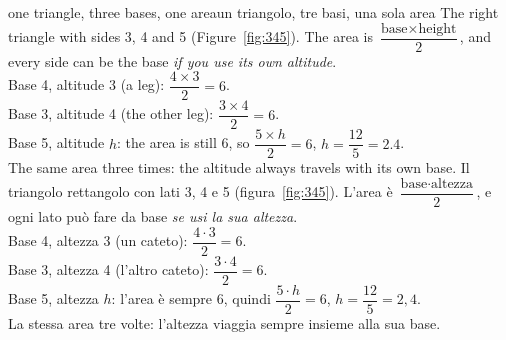 \begin{example}{one triangle, three bases, one area}{un triangolo, tre basi, una sola area}
The right triangle with sides 3, 4 and 5 (Figure~\ref{fig:345}). The area is $\dfrac{\text{base} \times \text{height}}{2}$, and every side can be the base \emph{if you use its own altitude}.\\
Base 4, altitude 3 (a leg): $\dfrac{4 \times 3}{2} = 6$.\\
Base 3, altitude 4 (the other leg): $\dfrac{3 \times 4}{2} = 6$.\\
Base 5, altitude $h$: the area is still 6, so $\dfrac{5 \times h}{2} = 6$, $h = \dfrac{12}{5} = 2.4$.\\
The same area three times: the altitude always travels with its own base.
\tcblower
Il triangolo rettangolo con lati 3, 4 e 5 (figura~\ref{fig:345}). L'area è $\dfrac{\text{base} \cdot \text{altezza}}{2}$, e ogni lato può fare da base \emph{se usi la sua altezza}.\\
Base 4, altezza 3 (un cateto): $\dfrac{4 \cdot 3}{2} = 6$.\\
Base 3, altezza 4 (l'altro cateto): $\dfrac{3 \cdot 4}{2} = 6$.\\
Base 5, altezza $h$: l'area è sempre 6, quindi $\dfrac{5 \cdot h}{2} = 6$, $h = \dfrac{12}{5} = 2{,}4$.\\
La stessa area tre volte: l'altezza viaggia sempre insieme alla sua base.
\end{example}

